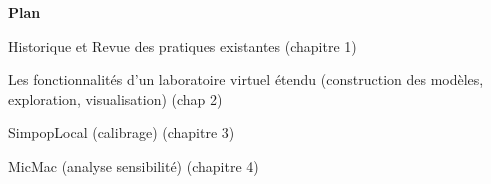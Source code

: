 






\printbibliography[heading=subbibliography]

\textbf{Plan}

Historique et Revue des pratiques existantes (chapitre 1)

Les fonctionnalités d’un laboratoire virtuel étendu (construction des modèles, exploration, visualisation) (chap 2)

SimpopLocal (calibrage) (chapitre 3)

MicMac (analyse sensibilité) (chapitre 4)

